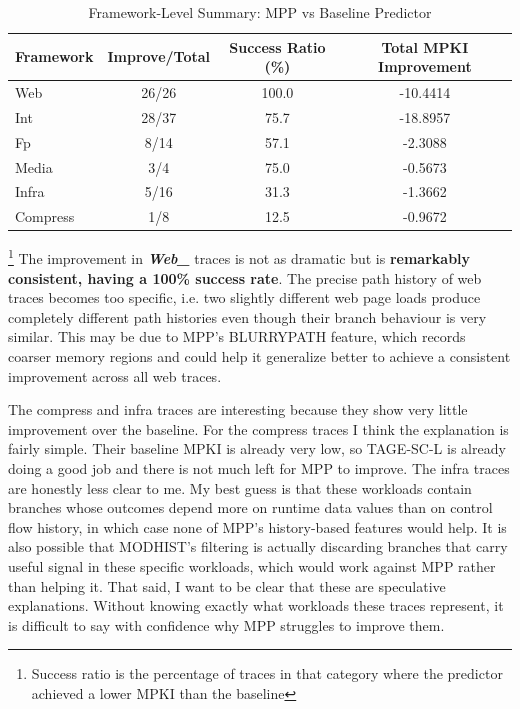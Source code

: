 \documentclass[11pt,a4paper]{article}
\begin{document}
\begin{table}[H]
\centering
\caption{Framework-Level Summary: MPP vs Baseline Predictor}
\label{tab:mpp_framework_summary}
\begin{tabular}{lccc}
\toprule
\textbf{Framework} & \textbf{Improve/Total} & \textbf{Success Ratio (\%}) & \textbf{Total MPKI Improvement} \\
\midrule
Web       & 26/26 & 100.0 & -10.4414 \\
Int       & 28/37 & 75.7  & -18.8957 \\
Fp        & 8/14  & 57.1  & -2.3088  \\
Media     & 3/4   & 75.0  & -0.5673  \\
Infra     & 5/16  & 31.3  & -1.3662  \\
Compress  & 1/8   & 12.5  & -0.9672  \\
\bottomrule
\end{tabular}
\end{table}

\footnote{Success ratio is the percentage of traces in that category where the predictor achieved a lower MPKI than the baseline}
The improvement in \textbf{\textit{Web\_}} traces is not as dramatic but is \textbf{remarkably consistent, having a 100\% success rate}. The precise path history of web traces becomes too specific, i.e. two slightly different web page loads produce
completely different path histories even though their branch behaviour is very similar. This may be due to MPP's BLURRYPATH feature, which records coarser memory regions and could help it generalize better to achieve a consistent improvement across all web traces.

The compress and infra traces are interesting because they show very little improvement over the baseline. For the compress traces I think the explanation is fairly simple. Their baseline MPKI is already very low, so TAGE-SC-L is
already doing a good job and there is not much left for MPP to improve. The infra traces are honestly less clear to me. My best guess is that these workloads contain branches whose outcomes depend more on runtime data values than on control
flow history, in which case none of MPP's history-based features would help. It is also possible that MODHIST's filtering is actually discarding branches that carry useful signal in these specific workloads, which would work against MPP
rather than helping it. That said, I want to be clear that these are speculative explanations. Without knowing exactly what workloads these traces represent, it is difficult to say with confidence why MPP struggles to improve them.
\end{document}
